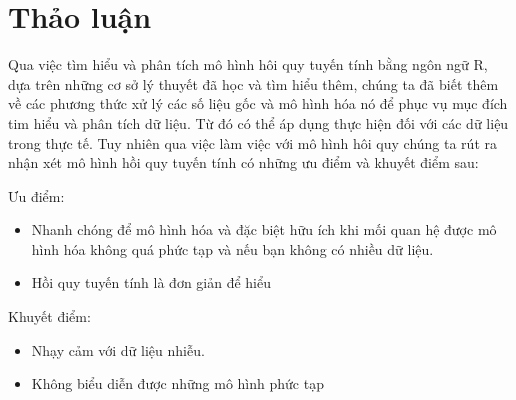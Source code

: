 \section{Thảo luận}
Qua việc tìm hiểu và phân tích mô hình hôi quy tuyến tính bằng ngôn ngữ R, dựa trên những cơ sở lý thuyết đã học và tìm hiểu thêm, chúng ta đã biết thêm về các phương thức xử lý các số liệu gốc và mô hình hóa nó để phục vụ mục đích tim hiểu và phân tích dữ liệu. Từ đó có thể áp dụng thực hiện đối với các dữ liệu trong thực tế. Tuy nhiên qua việc làm việc với mô hình hôi quy chúng ta rút ra nhận xét mô hình hồi quy tuyến tính có những ưu điểm và khuyết điểm sau:

Ưu điểm:
\begin{itemize}
    \item Nhanh chóng để mô hình hóa và đặc biệt hữu ích khi mối quan hệ được mô hình hóa không quá phức tạp và nếu bạn không có nhiều dữ liệu.
    \item Hồi quy tuyến tính là đơn giản để hiểu
\end{itemize}

Khuyết điểm:
\begin{itemize}
    \item Nhạy cảm với dữ liệu nhiễu.
    \item Không biểu diễn được những mô hình phức tạp
\end{itemize}